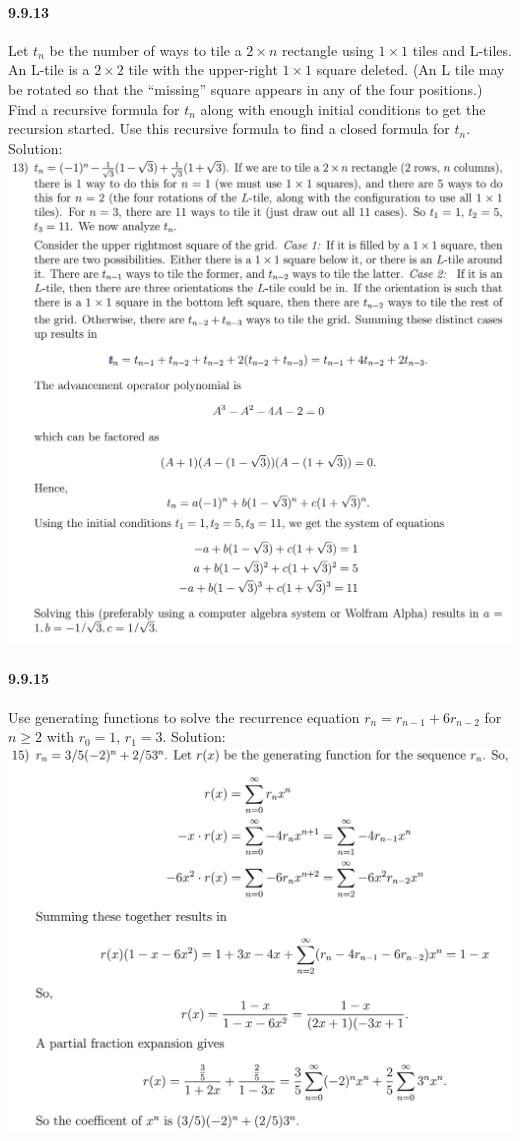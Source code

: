 \documentclass{article}
\begin{document}
\paragraph{9.9.13}
Let $t_n$ be the number of ways to tile a $2\times n$ rectangle using $1\times 1$ tiles and L-tiles. An
L-tile is a $2 \times 2$ tile with the upper-right $1 \times 1$ square deleted. (An L tile may be rotated so that the “missing” square appears in any of the four positions.) Find a recursive formula for $t_n$ along with enough initial conditions to get the recursion started. Use this recursive formula to find a closed formula for $t_n$.\newline
Solution:\newline
\includegraphics{0048}
\paragraph{9.9.15}
Use generating functions to solve the recurrence equation $r_n=r_{n-1}+6r_{n-2}$ for $n\ge 2$ with $r_0=1$, $r_1=3$.\newline
Solution:\newline
\includegraphics{0049}
\end{document}

